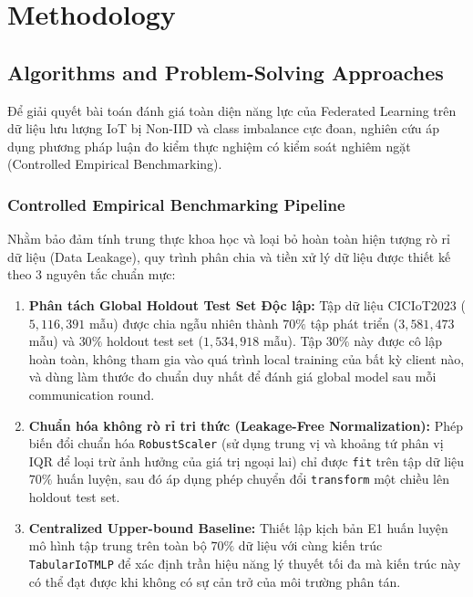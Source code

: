\chapter{Methodology}
\label{chap:methodology}

\section{Algorithms and Problem-Solving Approaches}
\label{sec:meth_approaches}
Để giải quyết bài toán đánh giá toàn diện năng lực của Federated Learning trên dữ liệu lưu lượng IoT bị Non-IID và class imbalance cực đoan, nghiên cứu áp dụng phương pháp luận đo kiểm thực nghiệm có kiểm soát nghiêm ngặt (Controlled Empirical Benchmarking).

\subsection{Controlled Empirical Benchmarking Pipeline}
Nhằm bảo đảm tính trung thực khoa học và loại bỏ hoàn toàn hiện tượng rò rỉ dữ liệu (Data Leakage), quy trình phân chia và tiền xử lý dữ liệu được thiết kế theo 3 nguyên tắc chuẩn mực:
\begin{enumerate}
    \item \textbf{Phân tách Global Holdout Test Set Độc lập:} Tập dữ liệu CICIoT2023 ($5,116,391$ mẫu) được chia ngẫu nhiên thành $70\%$ tập phát triển ($3,581,473$ mẫu) và $30\%$ holdout test set ($1,534,918$ mẫu). Tập $30\%$ này được cô lập hoàn toàn, không tham gia vào quá trình local training của bất kỳ client nào, và dùng làm thước đo chuẩn duy nhất để đánh giá global model sau mỗi communication round.
    \item \textbf{Chuẩn hóa không rò rỉ tri thức (Leakage-Free Normalization):} Phép biến đổi chuẩn hóa \texttt{RobustScaler} (sử dụng trung vị và khoảng tứ phân vị IQR để loại trừ ảnh hưởng của giá trị ngoại lai) chỉ được \texttt{fit} trên tập dữ liệu $70\%$ huấn luyện, sau đó áp dụng phép chuyển đổi \texttt{transform} một chiều lên holdout test set.
    \item \textbf{Centralized Upper-bound Baseline:} Thiết lập kịch bản E1 huấn luyện mô hình tập trung trên toàn bộ $70\%$ dữ liệu với cùng kiến trúc \texttt{TabularIoTMLP} để xác định trần hiệu năng lý thuyết tối đa mà kiến trúc này có thể đạt được khi không có sự cản trở của môi trường phân tán.
\end{enumerate}

